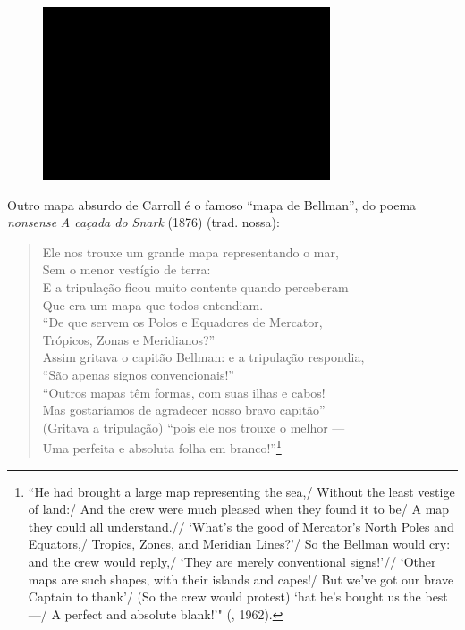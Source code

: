 \begin{figure}[!ht]
\centering
 \includegraphics[width=85mm]{./imgs/im1.jpg}
\caption{\tiny{}}
\end{figure}

Outro mapa absurdo de Carroll é o famoso ``mapa de Bellman'', do poema
\emph{nonsense} \emph{A caçada do Snark} (1876) (trad. nossa): \label{bellman}

\begin{verse}
Ele nos trouxe um grande mapa \qb{}representando o mar,\\
Sem o menor vestígio de terra:\\
E a tripulação ficou muito contente \qb{}quando perceberam\\
Que era um mapa que todos entendiam.\\[5pt]
``De que servem os Polos e Equadores \qb{}de Mercator,\\
Trópicos, Zonas e Meridianos?''\\
Assim gritava o capitão Bellman: e a \qb{}tripulação respondia,\\
``São apenas signos convencionais!''\\[5pt]
``Outros mapas têm formas, com suas \qb{}ilhas e cabos!\\
Mas gostaríamos de agradecer nosso \qb{}bravo capitão''\\
(Gritava a tripulação) ``pois ele nos \qb{}trouxe o melhor ---\\
Uma perfeita e absoluta folha em \qb{}branco!''\footnote{``He had brought a
  large map representing the sea,/ Without the least vestige of land:/
  And the crew were much pleased when they found it to be/ A map they
  could all understand.// `What's the good of Mercator's North Poles
  and Equators,/ Tropics, Zones, and Meridian Lines?'/ So the Bellman
  would cry: and the crew would reply,/ `They are merely conventional
  signs!'// `Other maps are such shapes, with their islands and capes!/
  But we've got our brave Captain to thank'/ (So the crew would
  protest) `hat he's bought us the best ---/ A perfect and absolute
  blank!'" (, 1962).}
\end{verse}

